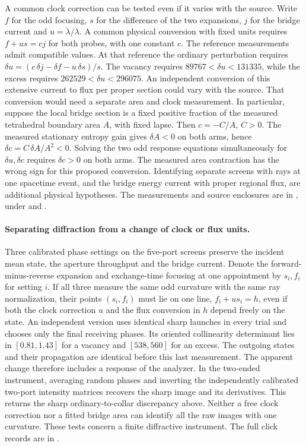 \documentclass[11pt]{article}
\begin{document}
A common clock correction can be tested even if it varies with the
source. Write \(f\) for the odd focusing, \(s\) for the difference
of the two expansions, \(j\) for the bridge current and
\(u=\ddot\lambda/\dot\lambda\). A common physical conversion
with fixed units requires \(f+us=cj\) for both probes, with one
constant \(c\). The reference measurements admit compatible
values. At that reference the ordinary perturbation requires
\(\delta u=(c\,\delta j-\delta f-u\,\delta s)/s\).
The vacancy requires \(89767<\delta u<131335\), while the excess
requires \(262529<\delta u<296075\). An independent conversion
of this extensive current to flux per proper section could vary with
the source. That conversion would need a separate area and clock
measurement. In particular, suppose the local bridge section is a
fixed positive fraction of the measured tetrahedral boundary area
\(A\), with fixed lapse. Then \(c=-C/A\), \(C>0\).
The measured stationary entropy gain gives \(\delta A<0\) on both
arms, hence \(\delta c=C\,\delta A/A^2<0\). Solving the two odd
response equations simultaneously for \(\delta u,\delta c\)
requires \(\delta c>0\) on both arms. The measured area contraction
has the wrong sign for this proposed conversion. Identifying separate
screens with rays at one spacetime
event, and the bridge energy current with proper regional flux, are
additional physical hypotheses. The measurements and source enclosures
are in ,
under  and .

\paragraph{Separating diffraction from a change of clock or flux units.}
Three calibrated phase settings on the five-port screens preserve the
incident mean state, the aperture throughput and the bridge current.
Denote the forward-minus-reverse expansion and exchange-time focusing
at one appointment by \(s_i,f_i\) for setting \(i\).
If all three measure the same odd curvature with the same ray
normalization, their points \((s_i,f_i)\) must lie on one line,
\(f_i+u s_i=h\), even if both the clock correction \(u\) and the
flux conversion in \(h\) depend freely on the state. An independent
version uses identical sharp launches in every trial and chooses only
the final receiving phases. Its oriented collinearity determinant lies
in \([0.81,1.43]\) for a vacancy and \([538,560]\) for an excess.
The outgoing states and their propagation are identical before this
last measurement. The apparent change therefore includes a response
of the analyzer. In the two-ended instrument, averaging random phases
and inverting the independently calibrated two-port intensity matrices
recovers the sharp image and its derivatives. This returns the sharp
ordinary-to-collar discrepancy above. Neither a free clock correction
nor a fitted bridge area can identify all the raw images with one
curvature. These tests concern a finite diffractive instrument.
The full click records are in .
\end{document}
